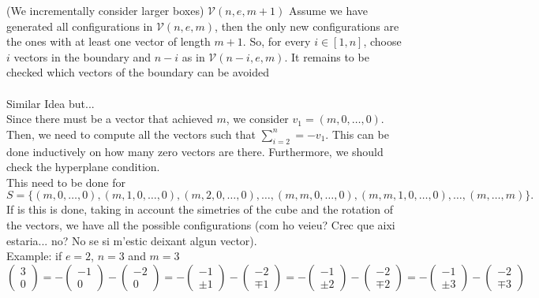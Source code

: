 \documentclass[10pt]{article}
\begin{document}
\begin{enumerate}
(We incrementally consider larger boxes) $\mathcal{V}(n,e,m + 1)$
Assume we have generated all configurations in $\mathcal{V}(n,e,m)$, then the only new configurations are the ones with at least one vector of length $m+1$. So, for every $i \in [1,n]$, choose $i$ vectors in the boundary and $n-i$ as in $\mathcal{V}(n-i,e,m)$. It remains to be checked which vectors of the boundary can be avoided
\\\\Similar Idea but...
\\Since there must be a vector that achieved $m$, we consider $v_1=(m,0,\dots,0)$. Then, we need to compute all the vectors such that $\sum_{i=2}^{n} = - v_1$. This can be done inductively on how many zero vectors are there. Furthermore, we should check the hyperplane condition.
\\This need to be done for 
$$S = \{(m, 0, \dots, 0), (m,1, 0, \dots, 0), (m,2, 0, \dots, 0), \dots,  (m,m,0,\dots, 0), (m,m,1,0,\dots,0), \dots, (m, \dots, m)\}.$$
If is this is done, taking in account the simetries of the cube and the rotation of the vectors, we have all the possible configurations (com ho veieu? Crec que aixi estaria... no? No se si m'estic deixant algun vector).
\\Example: if $e=2$, $n=3$ and $m=3$
	$$\begin{pmatrix} 3 \\ 0\end{pmatrix} = 
	- \begin{pmatrix} -1 \\ 0\end{pmatrix} - \begin{pmatrix} -2 \\ 0\end{pmatrix} =
	- \begin{pmatrix} -1 \\ \pm 1\end{pmatrix} - \begin{pmatrix} -2 \\ \mp 1\end{pmatrix} =
	- \begin{pmatrix} -1 \\ \pm 2\end{pmatrix} - \begin{pmatrix} -2 \\ \mp 2\end{pmatrix} =
	- \begin{pmatrix} -1 \\ \pm 3\end{pmatrix} - \begin{pmatrix} -2 \\ \mp 3\end{pmatrix}$$
	

\end{enumerate}
\end{document}
